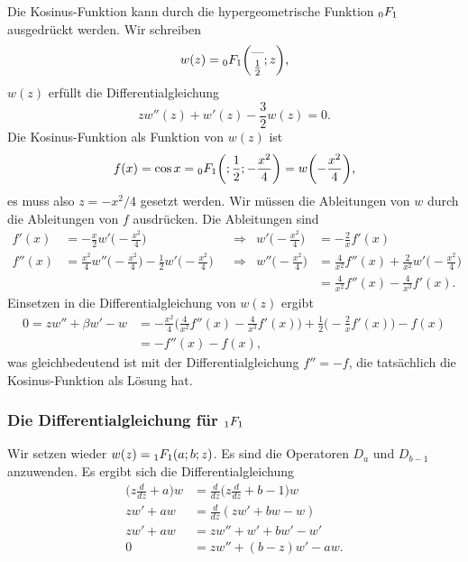 \begin{beispiel}
Die Kosinus-Funktion kann durch die hypergeometrische Funktion
$\mathstrut_0F_1$ ausgedrückt werden.
Wir schreiben 
\[
w(z)
=
\mathstrut_0F_1\biggl(
\begin{matrix}\text{---}\\\frac12\end{matrix}
;z\biggr),
\]
$w(z)$ erfüllt die Differentialgleichung
\[
zw''(z) +w'(z) -\frac{3}{2} w(z) = 0.
\]
Die Kosinus-Funktion als Funktion von $w(z)$ ist
\[
f(x)
=
\cos x = \mathstrut_0F_1\biggl(;\frac12;-\frac{x^2}4\biggr)
=
w\biggl(-\frac{x^2}4\biggr),
\]
es muss also $z=-x^2/4$ gesetzt werden.
Wir müssen die Ableitungen von $w$ durch die Ableitungen von $f$
ausdrücken.
Die Ableitungen sind
\begin{align*}
f'(x)
&=
-\frac{x}{2}
w'\biggl(-\frac{x^2}4\biggr)
&&\Rightarrow&
w'\biggl(-\frac{x^2}4\biggr)
&=
-\frac{2}{x}f'(x)
\\
f''(x)
&=
\frac{x^2}{4}w''\biggl(-\frac{x^2}4\biggr)
-\frac12w'\biggl(-\frac{x^2}4\biggr)
&&\Rightarrow&
w''\biggl(-\frac{x^2}4\biggr)
&=
\frac{4}{x^2}f''(x)
+\frac{2}{x^2}w'\biggl(-\frac{x^2}4\biggr)
\\
&&&&
&=
\frac{4}{x^2}f''(x)
-\frac{4}{x^3}f'(x).
\end{align*}
Einsetzen in die Differentialgleichung von $w(z)$ ergibt
\begin{align*}
0=
zw''+\beta w'-w
&=
-\frac{x^2}4
\biggl(
\frac{4}{x^2}f''(x)-\frac{4}{x^3}f'(x)
\biggr)
+\frac12\biggl(
-\frac2xf'(x)
\biggr)
-f(x)
\\
&=
-f''(x)
-f(x),
\end{align*}
was gleichbedeutend ist mit der Differentialgleichung $f''=-f$, die
tatsächlich die Kosinus-Funktion als Lösung hat.
\end{beispiel}

%
%
\subsubsection{Die Differentialgleichung für $\mathstrut_1F_1$}
Wir setzen wieder $w(z) = \mathstrut_1F_1(a;b;z)$.
Es sind die Operatoren $D_a$ und $D_{b-1}$ anzuwenden.
Es ergibt sich die Differentialgleichung
\begin{align*}
\biggl(z\frac{d}{dz}+a\biggr)w
&=
\frac{d}{dz}\biggl(z\frac{d}{dz} +b-1\biggr)w
\\
zw'+a w
&=
\frac{d}{dz}
(zw'+b w - w)
\\
zw'+a w
&=
zw'' +w'+b w' - w'
\\
0
&=
zw'' + (b - z)w' - a w.
\end{align*}

